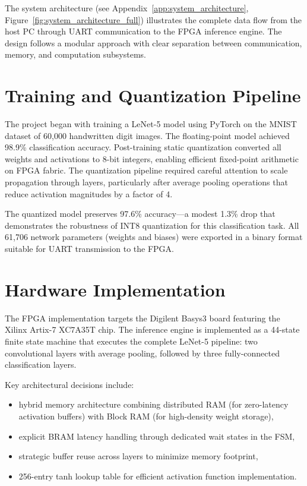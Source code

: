 \documentclass[12pt,a4paper]{report}
\begin{document}
The system architecture (see Appendix~\ref{app:system_architecture}, Figure~\ref{fig:system_architecture_full}) illustrates the complete data flow from the host PC through UART communication to the FPGA inference engine. The design follows a modular approach with clear separation between communication, memory, and computation subsystems.

\section{Training and Quantization Pipeline}

The project began with training a LeNet-5 model using PyTorch on the MNIST dataset of 60,000 handwritten digit images. The floating-point model achieved 98.9\% classification accuracy. Post-training static quantization converted all weights and activations to 8-bit integers, enabling efficient fixed-point arithmetic on FPGA fabric. The quantization pipeline required careful attention to scale propagation through layers, particularly after average pooling operations that reduce activation magnitudes by a factor of 4.

The quantized model preserves 97.6\% accuracy—a modest 1.3\% drop that demonstrates the robustness of INT8 quantization for this classification task. All 61,706 network parameters (weights and biases) were exported in a binary format suitable for UART transmission to the FPGA.

\section{Hardware Implementation}

The FPGA implementation targets the Digilent Basys3 board featuring the Xilinx Artix-7 XC7A35T chip. The inference engine is implemented as a 44-state finite state machine that executes the complete LeNet-5 pipeline: two convolutional layers with average pooling, followed by three fully-connected classification layers.

Key architectural decisions include:
\begin{itemize}
    \item hybrid memory architecture combining distributed RAM (for zero-latency activation buffers) with Block RAM (for high-density weight storage),
    \item explicit BRAM latency handling through dedicated wait states in the FSM,
    \item strategic buffer reuse across layers to minimize memory footprint,
    \item 256-entry tanh lookup table for efficient activation function implementation.
\end{itemize}
\end{document}
